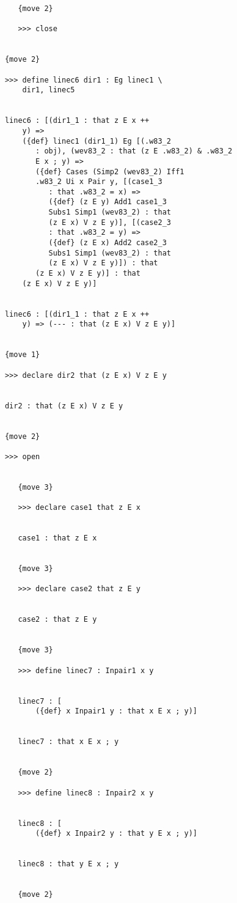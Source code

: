 \documentclass[12pt]{article}
\begin{document}
\begin{verbatim}
         {move 2}

         >>> close


      {move 2}

      >>> define linec6 dir1 : Eg linec1 \
          dir1, linec5


      linec6 : [(dir1_1 : that z E x ++ 
          y) => 
          ({def} linec1 (dir1_1) Eg [(.w83_2 
             : obj), (wev83_2 : that (z E .w83_2) & .w83_2 
             E x ; y) => 
             ({def} Cases (Simp2 (wev83_2) Iff1 
             .w83_2 Ui x Pair y, [(case1_3 
                : that .w83_2 = x) => 
                ({def} (z E y) Add1 case1_3 
                Subs1 Simp1 (wev83_2) : that 
                (z E x) V z E y)], [(case2_3 
                : that .w83_2 = y) => 
                ({def} (z E x) Add2 case2_3 
                Subs1 Simp1 (wev83_2) : that 
                (z E x) V z E y)]) : that 
             (z E x) V z E y)] : that 
          (z E x) V z E y)]


      linec6 : [(dir1_1 : that z E x ++ 
          y) => (--- : that (z E x) V z E y)]


      {move 1}

      >>> declare dir2 that (z E x) V z E y


      dir2 : that (z E x) V z E y


      {move 2}

      >>> open


         {move 3}

         >>> declare case1 that z E x


         case1 : that z E x


         {move 3}

         >>> declare case2 that z E y


         case2 : that z E y


         {move 3}

         >>> define linec7 : Inpair1 x y


         linec7 : [
             ({def} x Inpair1 y : that x E x ; y)]


         linec7 : that x E x ; y


         {move 2}

         >>> define linec8 : Inpair2 x y


         linec8 : [
             ({def} x Inpair2 y : that y E x ; y)]


         linec8 : that y E x ; y


         {move 2}


\end{verbatim}
\end{document}
